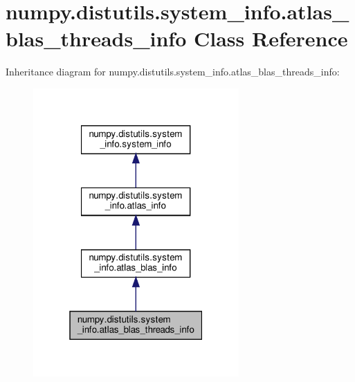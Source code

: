\hypertarget{classnumpy_1_1distutils_1_1system__info_1_1atlas__blas__threads__info}{}\section{numpy.\+distutils.\+system\+\_\+info.\+atlas\+\_\+blas\+\_\+threads\+\_\+info Class Reference}
\label{classnumpy_1_1distutils_1_1system__info_1_1atlas__blas__threads__info}


Inheritance diagram for numpy.\+distutils.\+system\+\_\+info.\+atlas\+\_\+blas\+\_\+threads\+\_\+info\+:
\nopagebreak
\begin{figure}[H]
\begin{center}
\leavevmode
\includegraphics[width=223pt]{classnumpy_1_1distutils_1_1system__info_1_1atlas__blas__threads__info__inherit__graph}
\end{center}
\end{figure}



